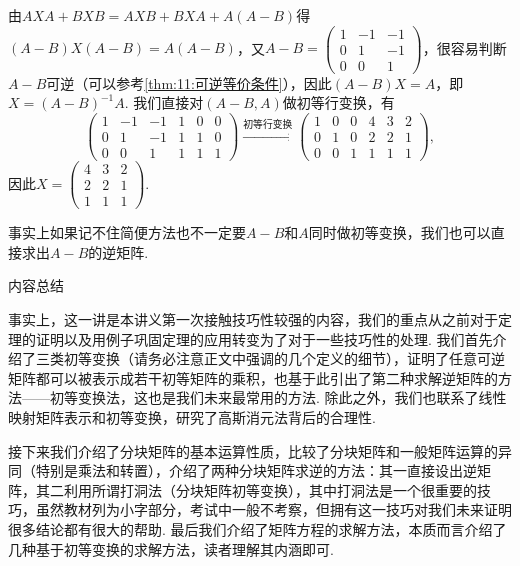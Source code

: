 \begin{solution}
    由$AXA+BXB=AXB+BXA+A(A-B)$得$(A-B)X(A-B)=A(A-B)$，又$A-B=\begin{pmatrix}
        1 & -1 & -1 \\ 0 & 1 & -1 \\ 0 & 0 & 1
    \end{pmatrix}$，很容易判断$A-B$可逆（可以参考\autoref{thm:11:可逆等价条件}），因此$(A-B)X=A$，即$X=(A-B)^{-1}A$.
    我们直接对$(A-B,A)$做初等行变换，有
    \[\begin{pmatrix}
            1 & -1 & -1 & 1 & 0 & 0 \\
            0 & 1  & -1 & 1 & 1 & 0 \\
            0 & 0  & 1  & 1 & 1 & 1
        \end{pmatrix}\xrightarrow{\text{初等行变换}}\begin{pmatrix}
            1 & 0 & 0 & 4 & 3 & 2 \\
            0 & 1 & 0 & 2 & 2 & 1 \\
            0 & 0 & 1 & 1 & 1 & 1
        \end{pmatrix},\]
    因此$X=\begin{pmatrix}
            4 & 3 & 2 \\ 2 & 2 & 1 \\ 1 & 1 & 1
        \end{pmatrix}$.
\end{solution}

事实上如果记不住简便方法也不一定要$A-B$和$A$同时做初等变换，我们也可以直接求出$A-B$的逆矩阵.

\vspace{2ex}
\centerline{\heiti \Large 内容总结}

事实上，这一讲是本讲义第一次接触技巧性较强的内容，我们的重点从之前对于定理的证明以及用例子巩固定理的应用转变为了对于一些技巧性的处理. 我们首先介绍了三类初等变换（请务必注意正文中强调的几个定义的细节），证明了任意可逆矩阵都可以被表示成若干初等矩阵的乘积，也基于此引出了第二种求解逆矩阵的方法——初等变换法，这也是我们未来最常用的方法. 除此之外，我们也联系了线性映射矩阵表示和初等变换，研究了高斯消元法背后的合理性.

接下来我们介绍了分块矩阵的基本运算性质，比较了分块矩阵和一般矩阵运算的异同（特别是乘法和转置），介绍了两种分块矩阵求逆的方法：其一直接设出逆矩阵，其二利用所谓打洞法（分块矩阵初等变换），其中打洞法是一个很重要的技巧，虽然教材列为小字部分，考试中一般不考察，但拥有这一技巧对我们未来证明很多结论都有很大的帮助. 最后我们介绍了矩阵方程的求解方法，本质而言介绍了几种基于初等变换的求解方法，读者理解其内涵即可.

